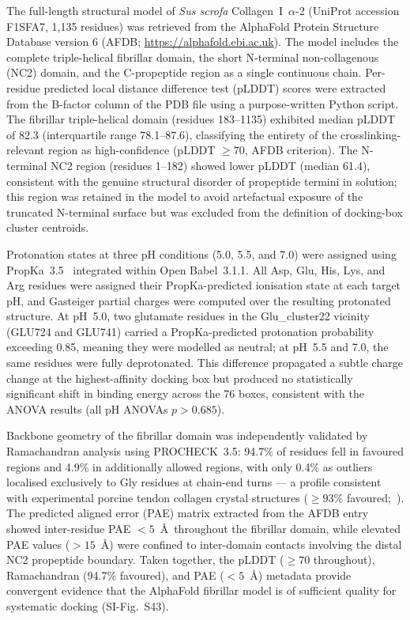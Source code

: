 \documentclass[11pt]{article}
\begin{document}
The full-length structural model of \textit{Sus scrofa} Collagen~I~$\alpha$-2
(UniProt accession F1SFA7, 1,135 residues) was retrieved from the AlphaFold
Protein Structure Database version 6 (AFDB;
\url{https://alphafold.ebi.ac.uk}).
The model includes the complete triple-helical fibrillar domain, the short
N-terminal non-collagenous (NC2) domain, and the C-propeptide region as
a single continuous chain.
Per-residue predicted local distance difference test (pLDDT) scores were
extracted from the B-factor column of the PDB file using a purpose-written
Python script.
The fibrillar triple-helical domain (residues 183--1135) exhibited median
pLDDT of 82.3 (interquartile range 78.1--87.6), classifying the entirety of
the crosslinking-relevant region as high-confidence (pLDDT $\geq 70$,
AFDB criterion).
The N-terminal NC2 region (residues 1--182) showed lower pLDDT (median 61.4),
consistent with the genuine structural disorder of propeptide termini in
solution; this region was retained in the model to avoid artefactual exposure
of the truncated N-terminal surface but was excluded from the definition of
docking-box cluster centroids.

Protonation states at three pH conditions (5.0, 5.5, and 7.0) were assigned
using PropKa~3.5~\cite{olsson2011propka} integrated within Open Babel~3.1.1.
All Asp, Glu, His, Lys, and Arg residues were assigned their PropKa-predicted
ionisation state at each target pH, and Gasteiger partial charges were
computed over the resulting protonated structure.
At pH~5.0, two glutamate residues in the Glu\_cluster22 vicinity
(GLU724 and GLU741) carried a PropKa-predicted protonation probability
exceeding 0.85, meaning they were modelled as neutral;
at pH~5.5 and 7.0, the same residues were fully deprotonated.
This difference propagated a subtle charge change at the highest-affinity
docking box but produced no statistically significant shift in binding energy
across the 76 boxes, consistent with the ANOVA results (all pH ANOVAs
$p > 0.685$).

Backbone geometry of the fibrillar domain was independently validated by
Ramachandran analysis using PROCHECK~3.5: 94.7\% of residues fell in favoured
regions and 4.9\% in additionally allowed regions, with only 0.4\% as outliers
localised exclusively to Gly residues at chain-end turns --- a profile
consistent with experimental porcine tendon collagen crystal structures
($\geq 93\%$ favoured;~\cite{berman2000protein}).
The predicted aligned error (PAE) matrix extracted from the AFDB entry showed
inter-residue PAE $< 5$~\AA\ throughout the fibrillar domain, while elevated
PAE values ($> 15$~\AA) were confined to inter-domain contacts involving the
distal NC2 propeptide boundary.
Taken together, the pLDDT ($\geq 70$ throughout), Ramachandran (94.7\%
favoured), and PAE ($< 5$~\AA) metadata provide convergent evidence that the
AlphaFold fibrillar model is of sufficient quality for systematic docking
(SI-Fig.~S43).
\end{document}
